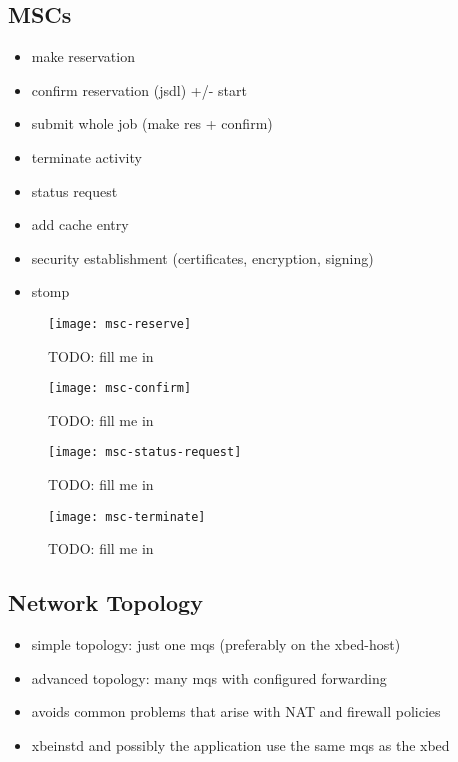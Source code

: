 \subsection{MSCs}

\begin{itemize}
\item make reservation
\item confirm reservation (jsdl) +/- start
\item submit whole job (make res + confirm)
\item terminate activity
\item status request
\item add cache entry
\item security establishment (certificates, encryption, signing)
\item stomp
\end{itemize}


\begin{figure}[ht]
  \centering
  \texttt{[image: msc-reserve]}
  \caption[MSC Make Reservation]{TODO: fill me in}
  \label{fig:msc-reserve}
\end{figure}

\begin{figure}[ht]
  \centering
  \texttt{[image: msc-confirm]}
  \caption[MSC Confirm Reservation]{TODO: fill me in}
  \label{fig:msc-confirm}
\end{figure}

\begin{figure}[ht]
  \centering
  \texttt{[image: msc-status-request]}
  \caption[MSC Request Task Status]{TODO: fill me in}
  \label{fig:msc-status-request}
\end{figure}

\begin{figure}[ht]
  \centering
  \texttt{[image: msc-terminate]}
  \caption[MSC Terminate Task Request]{TODO: fill me in}
  \label{fig:msc-terminate}
\end{figure}

\subsection{Network Topology}
\label{sec:network-topology}

\begin{itemize}
\item simple topology: just one mqs (preferably on the xbed-host)
\item advanced topology: many mqs with configured forwarding
\item avoids common problems that arise with NAT and firewall policies
\item xbeinstd and possibly the application use the same mqs as the xbed
\end{itemize}

